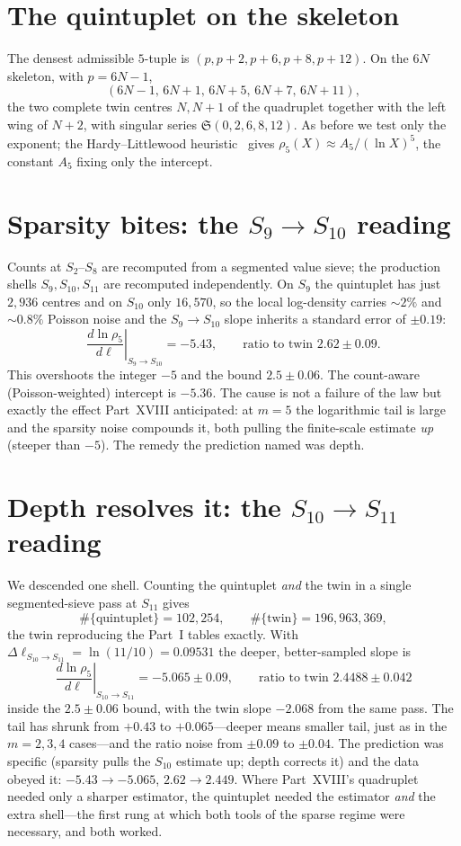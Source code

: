 \documentclass[11pt]{article}
\begin{document}
\section{The quintuplet on the skeleton}

The densest admissible $5$-tuple is $(p,p+2,p+6,p+8,p+12)$. On the $6N$ skeleton,
with $p=6N-1$,
\[
  (6N-1,\,6N+1,\,6N+5,\,6N+7,\,6N+11),
\]
the two complete twin centres $N,N+1$ of the quadruplet together with the left
wing of $N+2$, with singular series $\mathfrak{S}(0,2,6,8,12)$. As before we test
only the exponent; the Hardy--Littlewood heuristic~\cite{HL} gives
$\rho_5(X)\approx A_5/(\ln X)^5$, the constant $A_5$ fixing only the intercept.

\section{Sparsity bites: the $S_9\!\to\!S_{10}$ reading}

Counts at $S_2$--$S_8$ are recomputed from a segmented value sieve; the production
shells $S_9,S_{10},S_{11}$ are recomputed independently. On $S_9$ the quintuplet
has just $2{,}936$ centres and on $S_{10}$ only $16{,}570$, so the local
log-density carries $\sim2\%$ and $\sim0.8\%$ Poisson noise and the
$S_9\!\to\!S_{10}$ slope inherits a standard error of $\pm0.19$:
\[
  \left.\frac{d\ln\rho_5}{d\ell}\right|_{S_9\to S_{10}}=-5.43,
  \qquad \text{ratio to twin } 2.62\pm0.09 .
\]
This overshoots the integer $-5$ and the bound $2.5\pm0.06$. The count-aware
(Poisson-weighted) intercept is $-5.36$. The cause is not a failure of the law
but exactly the effect Part~XVIII anticipated: at $m=5$ the logarithmic tail is
large and the sparsity noise compounds it, both pulling the finite-scale estimate
\emph{up} (steeper than $-5$). The remedy the prediction named was depth.

\section{Depth resolves it: the $S_{10}\!\to\!S_{11}$ reading}

We descended one shell. Counting the quintuplet \emph{and} the twin in a single
segmented-sieve pass at $S_{11}$ gives
\[
  \#\{\text{quintuplet}\}=102{,}254,\qquad
  \#\{\text{twin}\}=196{,}963{,}369,
\]
the twin reproducing the Part~I tables exactly. With
$\Delta\ell_{S_{10}\to S_{11}}=\ln(11/10)=0.09531$ the deeper, better-sampled
slope is
\[
  \boxed{\ \left.\frac{d\ln\rho_5}{d\ell}\right|_{S_{10}\to S_{11}}
  = -5.065\pm0.09,\qquad \text{ratio to twin } 2.4488\pm0.042\ }
\]
inside the $2.5\pm0.06$ bound, with the twin slope $-2.068$ from the same pass.
The tail has shrunk from $+0.43$ to $+0.065$---deeper means smaller tail, just as
in the $m=2,3,4$ cases---and the ratio noise from $\pm0.09$ to $\pm0.04$. The
prediction was specific (sparsity pulls the $S_{10}$ estimate up; depth corrects
it) and the data obeyed it: $-5.43\to-5.065$, $2.62\to2.449$. Where Part~XVIII's
quadruplet needed only a sharper estimator, the quintuplet needed the estimator
\emph{and} the extra shell---the first rung at which both tools of the sparse
regime were necessary, and both worked.
\end{document}
